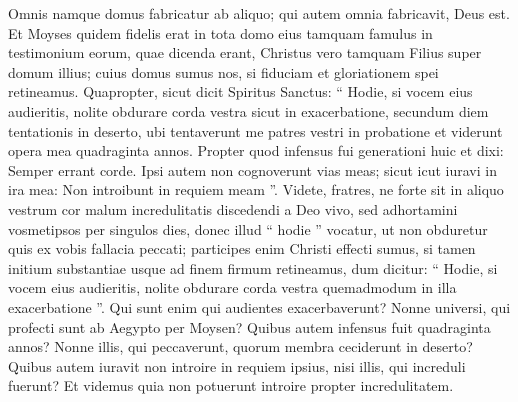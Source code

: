 \begin{biblechapter}
\begin{biblechapter}
\begin{biblechapter}
\verse Omnis namque domus fabricatur ab aliquo; qui autem omnia fabricavit, Deus est. 
\verse Et Moyses quidem fidelis erat in tota domo eius tamquam famulus in testimonium eorum, quae dicenda erant, 
\verse Christus vero tamquam Filius super domum illius; cuius domus sumus nos, si fiduciam et gloriationem spei retineamus.
 \verse Quapropter, sicut dicit Spiritus Sanctus:
 “ Hodie, si vocem eius audieritis,
 \verse nolite obdurare corda vestra sicut in exacerbatione,
 secundum diem tentationis in deserto,
 \verse ubi tentaverunt me patres vestri in probatione
 et viderunt opera mea 
\verse quadraginta annos. Propter quod infensus fui generationi huic et dixi: Semper errant corde.
 Ipsi autem non cognoverunt vias meas;
 \verse sicut icut iuravi in ira mea:
 Non introibunt in requiem meam ”.
 \verse Videte, fratres, ne forte sit in aliquo vestrum cor malum incredulitatis discedendi a Deo vivo, 
\verse sed adhortamini vosmetipsos per singulos dies, donec illud “ hodie ” vocatur, ut non obduretur quis ex vobis fallacia peccati; 
\verse participes enim Christi effecti sumus, si tamen initium substantiae usque ad finem firmum retineamus, 
\verse dum dicitur:
 “ Hodie, si vocem eius audieritis,
 nolite obdurare corda vestra quemadmodum in illa exacerbatione ”.
 \verse Qui sunt enim qui audientes exacerbaverunt? Nonne universi, qui profecti sunt ab Aegypto per Moysen? 
\verse Quibus autem infensus fuit quadraginta annos? Nonne illis, qui peccaverunt, quorum membra ceciderunt in deserto? 
 \verse Quibus autem iuravit non introire in requiem ipsius, nisi illis, qui increduli fuerunt? 
\verse Et videmus quia non potuerunt introire propter incredulitatem.
 

\end{biblechapter}
\end{biblechapter}
\end{biblechapter}
